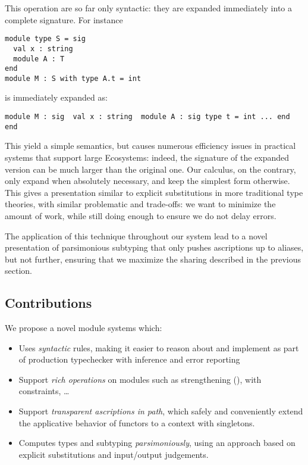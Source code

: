 This operation are so far only syntactic: they are expanded immediately into
a complete signature. For instance 
\begin{verbatim}
module type S = sig 
  val x : string
  module A : T
end
module M : S with type A.t = int
\end{verbatim}

is immediately expanded as:
\begin{verbatim}
module M : sig  val x : string  module A : sig type t = int ... end  end
\end{verbatim}

This yield a simple semantics, but causes numerous efficiency issues in
practical systems that support large Ecosystems: indeed, the signature
of the expanded version can be much larger than the original one.
Our calculus, on the contrary, only expand when absolutely necessary, and keep
the simplest form otherwise. This gives a presentation
similar to explicit substitutions in more traditional type theories, with
similar problematic and trade-offs: we want to minimize the amount of work,
while still doing enough to ensure we do not delay errors.

The application of this technique throughout our system lead to a novel
presentation of parsimonious subtyping that only pushes ascriptions up
to aliases, but not further, ensuring that we maximize the sharing described
in the previous section.


\subsection{Contributions}

We propose a novel module systems which:
\begin{itemize}
\item Uses \emph{syntactic} rules, making it easier to reason about and
  implement as part of production typechecker with inference and error reporting
\item Support \emph{rich operations} on modules such as strengthening (\cite{XL}),
  with constraints, \dots  
\item Support \emph{transparent ascriptions in path}, which safely and
  conveniently extend
  the applicative behavior of functors to a context with singletons.
\item Computes types and subtyping \emph{parsimoniously},
  using an approach based on explicit substitutions and input/output judgements.
\end{itemize}



